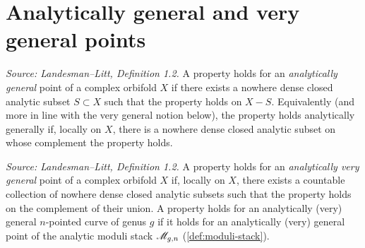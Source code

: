 \section{Analytically general and very general points}

\begin{definition}
  \label{def:analytically-general}
  \textit{Source: Landesman--Litt, Definition 1.2.}
  A property holds for an \emph{analytically general} point of a complex orbifold
  $X$ if there exists a nowhere dense closed analytic subset $S \subset X$ such
  that the property holds on $X - S$. Equivalently (and more in line with the very
  general notion below), the property holds analytically generally if, locally on
  $X$, there is a nowhere dense closed analytic subset on whose complement the
  property holds.
\end{definition}

\begin{definition}
  \label{def:analytically-very-general}
  \textit{Source: Landesman--Litt, Definition 1.2.}
  A property holds for an \emph{analytically very general} point of a complex
  orbifold $X$ if, locally on $X$, there exists a countable collection of nowhere
  dense closed analytic subsets such that the property holds on the complement of
  their union. A property holds for an analytically (very) general $n$-pointed
  curve of genus $g$ if it holds for an analytically (very) general point of the
  analytic moduli stack $\mathscr{M}_{g,n}$ (\cref{def:moduli-stack}).
\end{definition}

